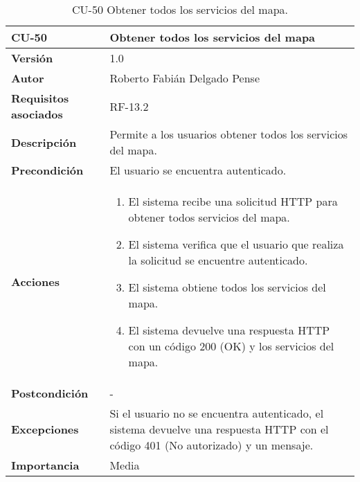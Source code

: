 \begin{table}[p]
	\centering
	\begin{tabularx}{\linewidth}{ p{} p{} }
		\toprule
		\textbf{CU-50}    & \textbf{ Obtener todos los servicios del mapa}\\
		\toprule
		\textbf{Versión}              & 1.0    \\
		\textbf{Autor}                & Roberto Fabián Delgado Pense \\
		\textbf{Requisitos asociados} & RF-13.2 \\ 
		\textbf{Descripción}          & Permite a los usuarios obtener todos los servicios del mapa. \\
		\textbf{Precondición}         & El usuario se encuentra autenticado. \\  
		\textbf{Acciones}             &
		\begin{enumerate}
			\def\labelenumi{\arabic{enumi}.}
			\tightlist
			\item El sistema recibe una solicitud HTTP para obtener todos servicios del mapa.
                \item El sistema verifica que el usuario que realiza la solicitud se encuentre autenticado.
			\item El sistema obtiene todos los servicios del mapa.
                \item El sistema devuelve una respuesta HTTP con un código 200 (OK) y los servicios del mapa.         
            \end{enumerate}\\
		\textbf{Postcondición}        & -  \\
		\textbf{Excepciones}          &  Si el usuario no se encuentra autenticado, el 
                    sistema devuelve una respuesta HTTP con el código 401 (No autorizado) y un mensaje.\\
		\textbf{Importancia}          & Media \\
		\bottomrule
	\end{tabularx}
	\caption{CU-50  Obtener todos los servicios del mapa.}
\end{table}


